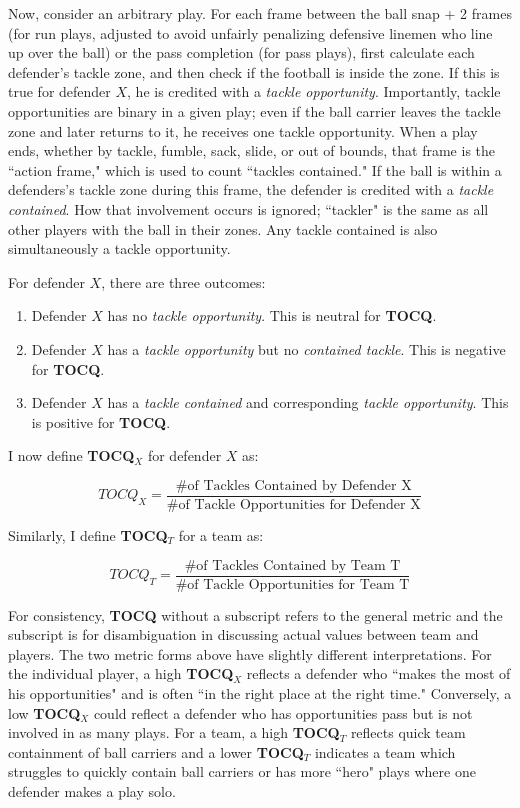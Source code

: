 \documentclass{article}
\begin{document}
Now, consider an arbitrary play. For each frame between the ball snap + 2 frames (for run plays, adjusted to avoid unfairly penalizing defensive linemen who line up over the ball) or the pass completion (for pass plays), first calculate each defender's tackle zone, and then check if the football is inside the zone. If this is true for defender $X$, he is credited with a \textit{tackle opportunity}. Importantly, tackle opportunities are binary in a given play; even if the ball carrier leaves the tackle zone and later returns to it, he receives one tackle opportunity. When a play ends, whether by tackle, fumble, sack, slide, or out of bounds, that frame is the ``action frame," which is used to count ``tackles contained." If the ball is within a defenders's tackle zone during this frame, the defender is credited with a \textit{tackle contained}. How that involvement occurs is ignored; ``tackler" is the same as all other players with the ball in their zones. Any tackle contained is also simultaneously a tackle opportunity. 

For defender $X$, there are three outcomes:
\begin{enumerate}
    \item Defender $X$ has no \textit{tackle opportunity}. This is neutral for \textbf{TOCQ}.
    \item Defender $X$ has a \textit{tackle opportunity} but no \textit{contained tackle}. This is negative for \textbf{TOCQ}.
    \item Defender $X$ has a  \textit{tackle contained} and corresponding \textit{tackle opportunity}. This is positive for \textbf{TOCQ}.
\end{enumerate}

I now define \textbf{TOCQ$_X$} for defender $X$ as:

$$ TOCQ_X = \frac{\text{\# of Tackles Contained by Defender X}}{\text{\# of Tackle Opportunities for Defender X}} $$

Similarly, I define \textbf{TOCQ$_T$} for a team as:

$$ TOCQ_T = \frac{\text{\# of Tackles Contained by Team T}}{\text{\# of Tackle Opportunities for Team T}} $$

For consistency, \textbf{TOCQ} without a subscript refers to the general metric and the subscript is for disambiguation in discussing actual values between team and players. The two metric forms above have slightly different interpretations. For the individual player, a high \textbf{TOCQ$_X$} reflects a defender who ``makes the most of his opportunities" and is often ``in the right place at the right time." Conversely, a low \textbf{TOCQ$_X$} could reflect a defender who has opportunities pass but is not involved in as many plays. For a team, a high \textbf{TOCQ$_T$} reflects quick team containment of ball carriers and a lower \textbf{TOCQ$_T$} indicates a team which struggles to quickly contain ball carriers or has more ``hero" plays where one defender makes a play solo.
\end{document}
